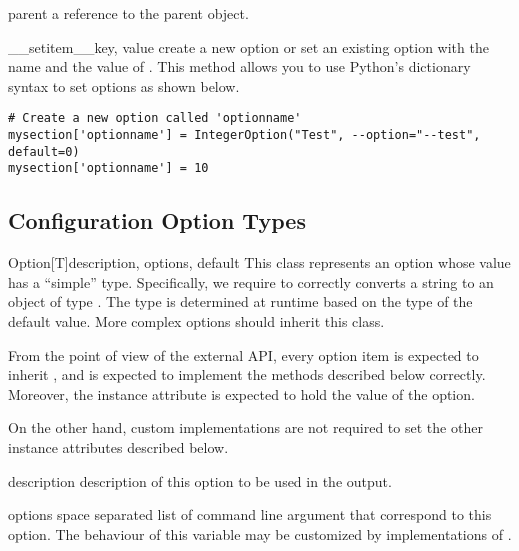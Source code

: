 \begin{memberdesc}[ConfigSection]{parent}
a reference to the parent  object.
\end{memberdesc}

\begin{methoddesc}[ConfigSection]{__setitem__}{key, value}
create a new option or set an existing option with the name  and
the value of .  This method allows you to use Python's 
dictionary syntax to set options as shown below.
\begin{verbatim}
# Create a new option called 'optionname'
mysection['optionname'] = IntegerOption("Test", --option="--test", default=0)
mysection['optionname'] = 10
\end{verbatim}
\end{methoddesc}

\subsection{Configuration Option Types}

\begin{classdesc}{Option[T]}{description, options, default}
  This class represents an option whose value has a ``simple'' type.
  Specifically, we require  to correctly converts a string 
  to an object of type . The type is determined at runtime based on
  the type of the default value. More complex options should inherit this class.

  From the point of view of the external API, every option item is expected to
  inherit , and is expected to implement the methods described
  below correctly. Moreover, the instance attribute  is expected
  to hold the value of the option.

  On the other hand, custom  implementations are not required
  to set the other instance attributes described below.
\end{classdesc}

\begin{memberdesc}[Option]{description}
  description of this option to be used in the  output.
\end{memberdesc}

\begin{memberdesc}[Option]{options}
  space separated list of command line argument that correspond to this option.
  The behaviour of this variable may be customized by implementations of
  .
\end{memberdesc}

